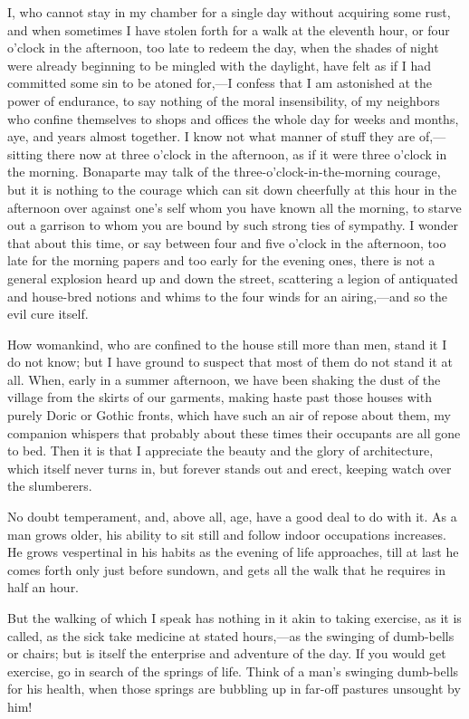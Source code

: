 \documentclass[twoside,openright,10pt]{memoir} %
\begin{document}
I, who cannot stay in my chamber for a single day without acquiring some rust, and when sometimes I have stolen forth for a walk at the eleventh hour, or four o’clock in the afternoon, too late to redeem the day, when the shades of night were already beginning to be mingled with the daylight, have felt as if I had committed some sin to be atoned for,—I confess that I am astonished at the power of endurance, to say nothing of the moral insensibility, of my neighbors who confine themselves to shops and offices the whole day for weeks and months, aye, and years almost together. I know not what manner of stuff they are of,—sitting there now at three o’clock in the afternoon, as if it were three o’clock in the morning. Bonaparte may talk of the three-o’clock-in-the-morning courage, but it is nothing to the courage which can sit down cheerfully at this hour in the afternoon over against one’s self whom you have known all the morning, to starve out a garrison to whom you are bound by such strong ties of sympathy. I wonder that about this time, or say between four and five o’clock in the afternoon, too late for the morning papers and too early for the evening ones, there is not a general explosion heard up and down the street, scattering a legion of antiquated and house-bred notions and whims to the four winds for an airing,—and so the evil cure itself.

How womankind, who are confined to the house still more than men, stand it I do not know; but I have ground to suspect that most of them do not stand it at all. When, early in a summer afternoon, we have been shaking the dust of the village from the skirts of our garments, making haste past those houses with purely Doric or Gothic fronts, which have such an air of repose about them, my companion whispers that probably about these times their occupants are all gone to bed. Then it is that I appreciate the beauty and the glory of architecture, which itself never turns in, but forever stands out and erect, keeping watch over the slumberers.

No doubt temperament, and, above all, age, have a good deal to do with it. As a man grows older, his ability to sit still and follow indoor occupations increases. He grows vespertinal in his habits as the evening of life approaches, till at last he comes forth only just before sundown, and gets all the walk that he requires in half an hour.

But the walking of which I speak has nothing in it akin to taking exercise, as it is called, as the sick take medicine at stated hours,—as the swinging of dumb-bells or chairs; but is itself the enterprise and adventure of the day. If you would get exercise, go in search of the springs of life. Think of a man’s swinging dumb-bells for his health, when those springs are bubbling up in far-off pastures unsought by him!
\end{document}
